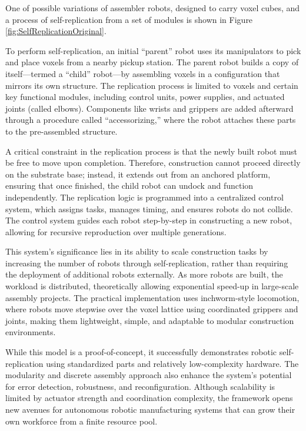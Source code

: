 One of possible variations of assembler robots, designed
to carry voxel cubes, and a process of self-replication 
from a set of modules is shown in Figure \ref{fig:SelfReplicationOriginal}.

To perform self-replication, an initial “parent” robot uses its manipulators to pick 
and place voxels from a nearby pickup station. The parent robot builds a copy 
of itself—termed a “child” robot—by assembling voxels in a configuration that 
mirrors its own structure. The replication process is limited to voxels and certain 
key functional modules, including control units, power supplies, and 
actuated joints (called elbows). Components like wrists and grippers are 
added afterward through a procedure called “accessorizing,” where the 
robot attaches these parts to the pre-assembled structure.

A critical constraint in the replication process is that the newly built robot must 
be free to move upon completion. Therefore, construction cannot proceed directly 
on the substrate base; instead, it extends out from an anchored platform, 
ensuring that once finished, the child robot can undock and function independently. 
The replication logic is programmed into a centralized control system, 
which assigns tasks, manages timing, and ensures robots do not collide. 
The control system guides each robot step-by-step in constructing a new robot, 
allowing for recursive reproduction over multiple generations.

This system's significance lies in its ability to scale construction tasks 
by increasing the number of robots through self-replication, 
rather than requiring the deployment of additional robots externally. 
As more robots are built, the workload is distributed, theoretically 
allowing exponential speed-up in large-scale assembly projects. 
The practical implementation uses inchworm-style locomotion, where robots 
move stepwise over the voxel lattice using coordinated grippers and joints, 
making them lightweight, simple, and adaptable to modular construction environments.

While this model is a proof-of-concept, it successfully demonstrates robotic 
self-replication using standardized parts and relatively low-complexity hardware. 
The modularity and discrete assembly approach also enhance the system’s 
potential for error detection, robustness, and reconfiguration. 
Although scalability is limited by actuator strength and coordination complexity, 
the framework opens new avenues for autonomous robotic manufacturing systems 
that can grow their own workforce from a finite resource pool.


